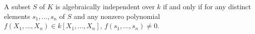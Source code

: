 A subset $S$ of $K$ is algebraically independent over $k$ if and only if for any distinct elements $s_1, \ldots, s_n$ of $S$ and any nonzero polynomial $f(X_1, \ldots, X_n) \in k[X_1, \ldots, X_n]$, $f(s_1, \ldots, s_n) \neq 0$.
